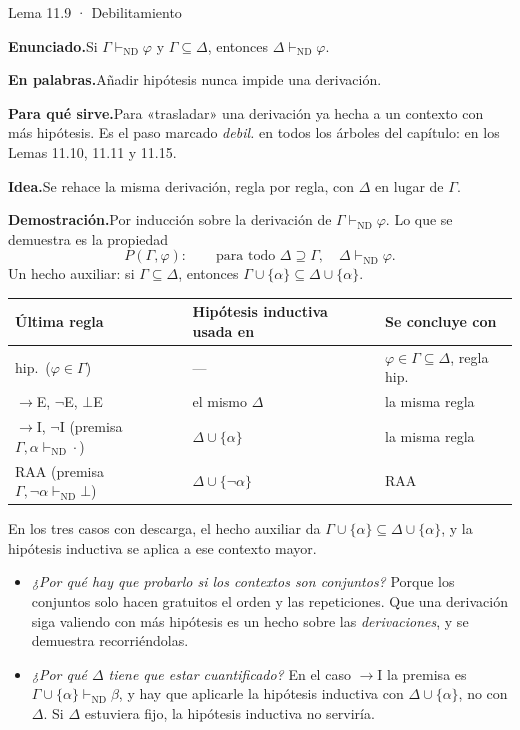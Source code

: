 \documentclass[11pt,a4paper]{article}
\newcommand{\campo}[1]{\par\smallskip\noindent\textbf{#1}\enspace}
\newcommand{\enunciado}{\campo{Enunciado.}}
\newcommand{\palabras}{\campo{En palabras.}}
\newcommand{\sirve}{\campo{Para qué sirve.}}
\newcommand{\idea}{\campo{Idea.}}
\newcommand{\prueba}{\campo{Demostración.}}
\newcommand{\Provnd}{\vdash_{\mathrm{ND}}}
\newcommand{\Imp}{\rightarrow}
\newcommand{\Not}{\neg}
\begin{document}
\begin{resultado}{Lema 11.9 · Debilitamiento}
\enunciado Si \(\Gamma\Provnd\varphi\) y \(\Gamma\subseteq\Delta\), entonces
\(\Delta\Provnd\varphi\).

\palabras Añadir hipótesis nunca impide una derivación.

\sirve Para «trasladar» una derivación ya hecha a un contexto con más
hipótesis. Es el paso marcado \emph{debil.} en todos los árboles del capítulo:
en los Lemas 11.10, 11.11 y 11.15.

\idea Se rehace la misma derivación, regla por regla, con \(\Delta\) en lugar
de \(\Gamma\).

\prueba Por inducción sobre la derivación de \(\Gamma\Provnd\varphi\). Lo que
se demuestra es la propiedad
\[
P(\Gamma,\varphi):\qquad \text{para todo }\Delta\supseteq\Gamma,\quad \Delta\Provnd\varphi .
\]
Un hecho auxiliar: si \(\Gamma\subseteq\Delta\), entonces
\(\Gamma\cup\{\alpha\}\subseteq\Delta\cup\{\alpha\}\).

\begin{center}
{\small
\renewcommand{\arraystretch}{1.25}
\begin{tabular}{@{}lll@{}}
\toprule
\textbf{Última regla} & \textbf{Hipótesis inductiva usada en} & \textbf{Se concluye con}\\
\midrule
hip.\ (\(\varphi\in\Gamma\)) & --- & \(\varphi\in\Gamma\subseteq\Delta\), regla hip.\\
\(\Imp\)E, \(\Not\)E, \(\bot\)E & el mismo \(\Delta\) & la misma regla\\
\(\Imp\)I, \(\Not\)I (premisa \(\Gamma,\alpha\Provnd\cdot\)) & \(\Delta\cup\{\alpha\}\) & la misma regla\\
RAA (premisa \(\Gamma,\Not\alpha\Provnd\bot\)) & \(\Delta\cup\{\Not\alpha\}\) & RAA\\
\bottomrule
\end{tabular}}
\end{center}
En los tres casos con descarga, el hecho auxiliar da
\(\Gamma\cup\{\alpha\}\subseteq\Delta\cup\{\alpha\}\), y la hipótesis
inductiva se aplica a ese contexto mayor.
\end{resultado}

\begin{trampa}
\begin{itemize}
  \item \emph{¿Por qué hay que probarlo si los contextos son conjuntos?}
    Porque los conjuntos solo hacen gratuitos el orden y las repeticiones.
    Que una derivación siga valiendo con más hipótesis es un hecho sobre las
    \emph{derivaciones}, y se demuestra recorriéndolas.
  \item \emph{¿Por qué \(\Delta\) tiene que estar cuantificado?} En el caso
    \(\Imp\)I la premisa es \(\Gamma\cup\{\alpha\}\Provnd\beta\), y hay que
    aplicarle la hipótesis inductiva con \(\Delta\cup\{\alpha\}\), no con
    \(\Delta\). Si \(\Delta\) estuviera fijo, la hipótesis inductiva no
    serviría.
\end{itemize}
\end{trampa}
\end{document}
